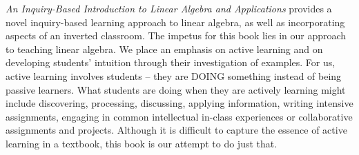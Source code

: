  \emph{An Inquiry-Based Introduction to Linear Algebra and Applications} provides a novel inquiry-based learning approach to linear algebra, as well as incorporating aspects of an inverted classroom. The impetus for this book lies in our approach to teaching linear algebra. We place an emphasis on active learning and on developing students' intuition through their investigation of examples. For us, active learning involves students -- they are DOING something instead of being passive learners. What students are doing when they are actively learning might include discovering, processing, discussing, applying information, writing intensive assignments, engaging in common intellectual in-class experiences or collaborative assignments and projects. Although it is difficult to capture the essence of active learning in a textbook, this book is our attempt to do just that.
 
